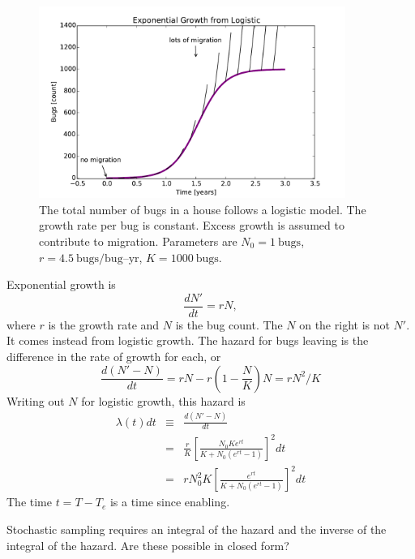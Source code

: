 \documentclass{article}
\begin{document}
\begin{figure}
\centerline{\includegraphics[width=10cm]{excess}}
\caption{The total number of bugs in a house follows
a logistic model. The growth rate per bug is constant.
Excess growth is assumed to contribute to migration.
Parameters are $N_0=1\:\mbox{bugs}$, $r=4.5\:\mbox{bugs/bug--yr}$, $K=1000\:\mbox{bugs}.$\label{fig:excessslopes}}
\end{figure}

Exponential growth is
\begin{equation}
  \frac{dN'}{dt}=rN,
\end{equation}
where $r$ is the growth rate and $N$ is the bug count.
The $N$ on the right is not $N'$. It comes instead from logistic
growth. The hazard for bugs leaving is the difference in the
rate of growth for each, or
\begin{equation}
  \frac{d(N'-N)}{dt}=rN-r\left(1-\frac{N}{K}\right)N=rN^2/K
\end{equation}
Writing out $N$ for logistic growth, this hazard is
\begin{eqnarray}
  \lambda(t)dt&\equiv & \frac{d(N'-N)}{dt} \\
  & = & \frac{r}{K}\left[
  \frac{N_0Ke^{rt}}{K+N_0(e^{rt}-1)}\right]^2dt \\
  &=&rN_0^2K\left[
    \frac{e^{rt}}{K+N_0(e^{rt}-1)}\right]^2dt
\end{eqnarray}
The time $t=T-T_e$ is a time since enabling.

Stochastic sampling requires an integral of the hazard
and the inverse of the integral of the hazard. Are these possible
in closed form?
\end{document}
